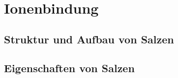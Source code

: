 \section{Ionenbindung}

\subsection{Struktur und Aufbau von Salzen}

\subsection{Eigenschaften von Salzen}